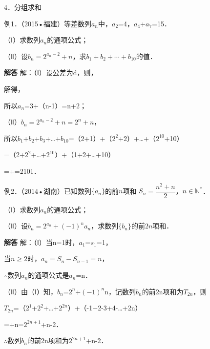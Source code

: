 4．分组求和\par
{}
例1．（2015•福建）等差数列{\ensuremath{a_{n}}}中，\ensuremath{a_{2}}=4，\ensuremath{a_{4}}+\ensuremath{a_{7}}=15．\par
（Ⅰ）求数列{\ensuremath{a_{n}}}的通项公式；\par
（Ⅱ）设$b_n=2^{a_n-2}+n$，求$b_1+b_2+\cdots+b_{10}$的值．\par
\QuestionSpace{4.8cm}
\ifshowanswers
\par\begingroup\color{solutioncolor}\noindent\textbf{解答}\quad
解：（Ⅰ）设公差为d，则，\par
解得，\par
所以\ensuremath{a_{n}}=3+（n-1）=n+2；\par
（Ⅱ）$b_n=2^{a_n-2}+n=2^n+n$，\par
所以\ensuremath{b_{1}}+\ensuremath{b_{2}}+\ensuremath{b_{3}}+\ldots{}+\ensuremath{b_{10}}=（2+1）+（\ensuremath{2^{2}}+2）+\ldots{}+（\ensuremath{2^{10}}+10）\par
=（2+\ensuremath{2^{2}}+\ldots{}+\ensuremath{2^{10}}）+（1+2+\ldots{}+10）\par
=+=2101．\par
\par\endgroup\fi

例2．（2014•湖南）已知数列$\{a_n\}$的前$n$项和
$S_n=\dfrac{n^2+n}{2}$，$n\in\mathbb N^*$．\par
（Ⅰ）求数列{\ensuremath{a_{n}}}的通项公式；\par
（Ⅱ）设$b_n=2^{a_n}+(-1)^na_n$，求数列$\{b_n\}$的前$2n$项和．\par
\QuestionSpace{4.8cm}
\ifshowanswers
\par\begingroup\color{solutioncolor}\noindent\textbf{解答}\quad
解：（Ⅰ）当n=1时，\ensuremath{a_{1}}=\ensuremath{s_{1}}=1，\par
当$n\ge2$时，$a_n=S_n-S_{n-1}=n$，\par
\ensuremath{\therefore}数列{\ensuremath{a_{n}}}的通项公式是\ensuremath{a_{n}}=n．\par
（Ⅱ）由（Ⅰ）知，\ensuremath{b_{n}}=\ensuremath{2^{n}}+\ensuremath{(-1)^{n}}n，记数列{\ensuremath{b_{n}}}的前2n项和为\ensuremath{T_{2n}}，则\par
\ensuremath{T_{2n}}=（\ensuremath{2^{1}}+\ensuremath{2^{2}}+\ldots{}+\ensuremath{2^{2n}}）+（-1+2-3+4-\ldots{}+2n）\par
=+n=\ensuremath{2^{2n+1}}+n-2．\par
\ensuremath{\therefore}数列{\ensuremath{b_{n}}}的前2n项和为\ensuremath{2^{2n+1}}+n-2．\par
\par\endgroup\fi

